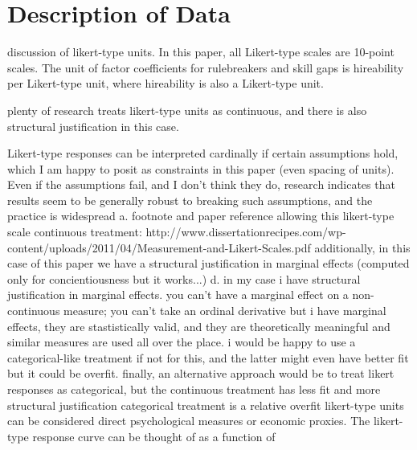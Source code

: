 \documentclass[review]{elsarticle}
\begin{document}

\section{Description of Data}

discussion of likert-type units. In this paper, all Likert-type scales are 10-point scales.
The unit of factor coefficients for rulebreakers and skill gaps is hireability per Likert-type unit, where hireability is also a Likert-type unit.

plenty of research treats likert-type units as continuous, and there is also structural justification in this case.

Likert-type responses can be interpreted cardinally if certain assumptions hold, which I am happy to posit as constraints in this paper (even spacing of units).
Even if the assumptions fail, and I don't think they do, research indicates that results seem to be generally robust to breaking such assumptions, and the practice is widespread
a. footnote and paper reference allowing this likert-type scale continuous treatment: http://www.dissertationrecipes.com/wp-content/uploads/2011/04/Measurement-and-Likert-Scales.pdf
additionally, in this case of this paper we have a structural justification in marginal effects (computed only for concientiousness but it works...)
d. in my case i have structural justification in marginal effects.
you can't have a marginal effect on a non-continuous measure; you can't take an ordinal derivative
but i have marginal effects, they are stastistically valid, and they are theoretically meaningful and similar measures are used all over the place.
i would be happy to use a categorical-like treatment if not for this, and the latter might even have better fit but it could be overfit.
finally, an alternative approach would be to treat likert responses as categorical, but the continuous treatment has less fit and more structural justification
categorical treatment is a relative overfit
likert-type units can be considered direct psychological measures or economic proxies.
The likert-type response curve can be thought of as a function of
\end{document}
